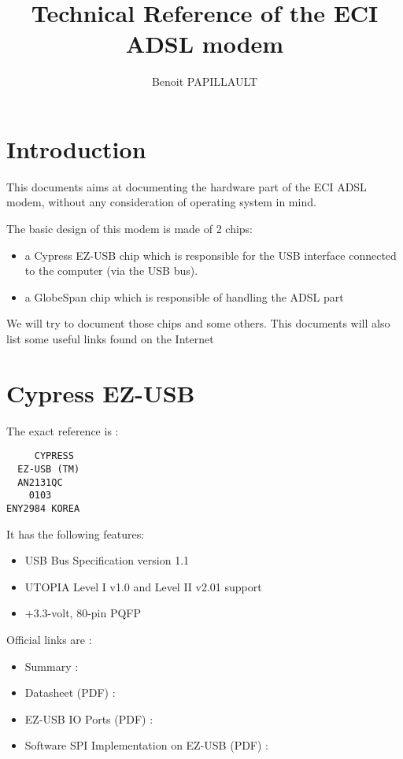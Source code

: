 \documentclass[a4paper,12pt]{article}
\title{\huge{Technical Reference of the ECI ADSL modem}}
\author{Benoit PAPILLAULT}
\begin{document}
\maketitle
\newpage
\tableofcontents
\newpage

\section{Introduction}

This documents aims at documenting the hardware part of the ECI ADSL
modem, without any consideration of operating system in mind.

The basic design of this modem is made of 2 chips:
\begin{itemize}
\item a Cypress EZ-USB chip which is responsible for the USB interface
connected to the computer (via the USB bus).
\item a GlobeSpan chip which is responsible of handling the ADSL part
\end{itemize}

We will try to document those chips and some others. This documents
will also list some useful links found on the Internet

\section{Cypress EZ-USB}

The exact reference is :
\begin{verbatim}
     CYPRESS
  EZ-USB (TM)
  AN2131QC
    0103
ENY2984 KOREA
\end{verbatim}

It has the following features:
\begin{itemize}
\item USB Bus Specification version 1.1
\item UTOPIA Level I v1.0 and Level II v2.01 support
\item +3.3-volt, 80-pin PQFP
\end{itemize}

Official links are :
\begin{itemize}
\item Summary :
\item Datasheet (PDF) :
\item EZ-USB IO Ports (PDF) :
\item Software SPI Implementation on EZ-USB (PDF) :
\end{itemize}
\end{document}
